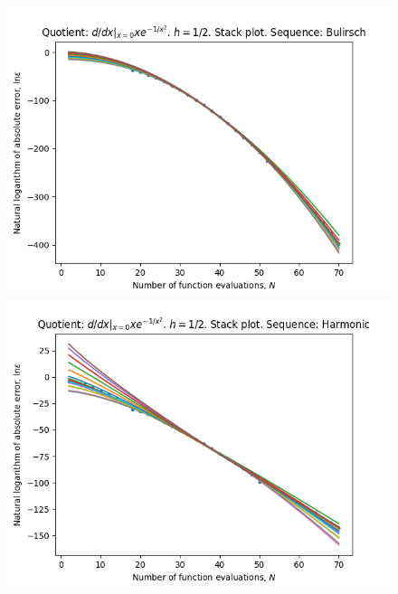 \begin{figure}[H]
\centering
\begin{minipage}{0.45\textwidth}
\centering
\includegraphics[scale=0.45]{../results/diff_quot_plots/xemxm2_hp_bulirsch_stack.png}
\end{minipage}
\begin{minipage}{0.45\textwidth}
\centering
\includegraphics[scale=0.45]{../results/diff_quot_plots/xemxm2_hp_harmonic_stack.png}
\end{minipage}
\end{figure}


